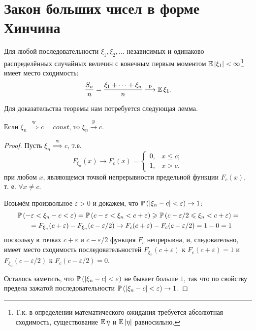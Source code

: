 \section{Закон больших чисел в форме Хинчина}
\begin{namedthm} \leavevmode

    Для любой последовательности $\xi_{1}, \xi_{2}, \ldots$ независимых и одинаково распределённых 
    случайных величин с конечным первым моментом $\operatorname{\mathbb{E}}\left|\xi_{1}\right|<\infty$\footnote{Т.к. в определении математического ожидания требуется абсолютная сходимость, существование $\operatorname{\mathbb{E}} \eta$ и $\operatorname{\mathbb{E}} \left| \eta \right|$ равносильно.} имеет место сходимость:
    \begin{equation*}
        \frac{S_{n}}{n} = \frac{\xi_{1}+\cdots+\xi_{n}}{n} %
        \stackrel{\text{p}}{\longrightarrow} \Exp \xi_1.
    \end{equation*}
\end{namedthm}
Для доказательства теоремы нам потребуется следующая лемма.
\begin{lem}
    Если $\xi_{n} \overset{\text{w}}{\implies} c=const$, то $\xi_{n} \xrightarrow[]{\text{p}} c$.
\end{lem}
\begin{proof}
    Пусть $\xi_{n} \overset{\text{w}}{\implies} c$, т.е.
    \begin{equation*}
        F_{\xi_{n}}(x) \to F_{c}(x) =
        \begin{cases}
            0, & x \leqslant c; \\
            1, & x > c.
        \end{cases}
    \end{equation*}
    при любом $x$, являющемся точкой непрерывности предельной функции $F_{c}(x)$, т. е. $\forall x \neq c$.
    
    Возьмём произвольное $\varepsilon>0$ и докажем, что $\operatorname{\mathbb{P}}\left(\left|\xi_{n}-c\right|<\varepsilon\right) \to 1$:
    \begin{multline*}
        \operatorname{\mathbb{P}}\left(-\varepsilon<\xi_{n}-c<\varepsilon\right)=\operatorname{\mathbb{P}}\left(c-\varepsilon<\xi_{n}<c+\varepsilon\right) \geqslant \operatorname{\mathbb{P}}\left(c-\varepsilon / 2 \leqslant \xi_{n}<c+\varepsilon\right)= \\
        \quad=F_{\xi_{n}}(c+\varepsilon)-F_{\xi_{n}}(c-\varepsilon / 2) \to F_{c}(c+\varepsilon)-F_{c}(c-\varepsilon / 2)=1-0=1
    \end{multline*}
    поскольку в точках $c+\varepsilon$ и $c-\varepsilon / 2$ функция $F_{c}$ непрерывна, и, следовательно, 
    имеет место сходимость последовательностей $F_{\xi_{n}}(c+\varepsilon)$ к $F_{c}(c+\varepsilon)=1$ и $F_{\xi_{n}}(c-\varepsilon / 2)$ к $F_{c}(c-\varepsilon / 2)=0$.
    
    Осталось заметить, что $\operatorname{\mathbb{P}}\left(\left|\xi_{n}-c\right|<\varepsilon\right)$ не бывает больше $1$, так что по свойству предела зажатой последовательности $\operatorname{\mathbb{P}}\left(\left|\xi_{n}-c\right|<\varepsilon\right) \to 1$.
\end{proof}

